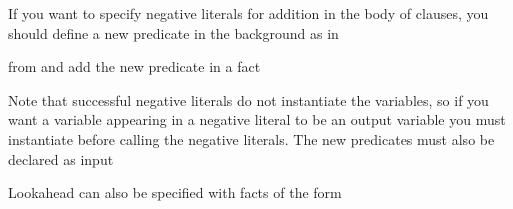 \documentclass[letterpaper,10pt,english]{sphinxmanual}
\begin{document}
If you want to specify negative literals for addition in the body of clauses, you should define a new predicate in the background as in

\begin{sphinxVerbatim}[commandchars=\\\{\}]
        \PYGZbs{} 
\PYGZbs{} 
\end{sphinxVerbatim}

from  and add the new predicate in a  fact

\begin{sphinxVerbatim}[commandchars=\\\{\}]
\end{sphinxVerbatim}

Note that successful negative literals do not instantiate the variables, so if you want a variable appearing in a negative literal to be an output variable you must instantiate before calling the negative literals.
The new predicates must also be declared as input

\begin{sphinxVerbatim}[commandchars=\\\{\}]
\end{sphinxVerbatim}

Lookahead can also be specified with facts of the form

\begin{sphinxVerbatim}[commandchars=\\\{\}]
  
\end{sphinxVerbatim}
\end{document}
